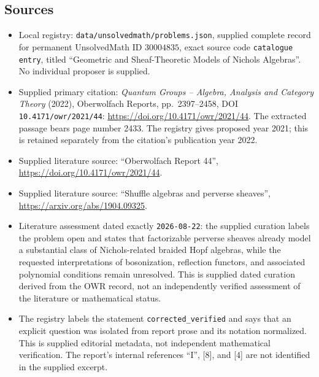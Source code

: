 \documentclass[11pt]{article}
\begin{document}
\subsection{Sources}
\begin{itemize}
\item Local registry: \texttt{data/unsolvedmath/problems.json}, supplied complete record for permanent UnsolvedMath ID \(30004835\), exact source code \texttt{catalogue entry}, titled ``Geometric and Sheaf-Theoretic Models of Nichols Algebras''. No individual proposer is supplied.
\item Supplied primary citation: \emph{Quantum Groups -- Algebra, Analysis and Category Theory} (2022), Oberwolfach Reports, pp.~2397--2458, DOI \texttt{10.4171/owr/2021/44}: \url{https://doi.org/10.4171/owr/2021/44}. The extracted passage bears page number 2433. The registry gives proposed year 2021; this is retained separately from the citation's publication year 2022.
\item Supplied literature source: ``Oberwolfach Report 44'', \url{https://doi.org/10.4171/owr/2021/44}.
\item Supplied literature source: ``Shuffle algebras and perverse sheaves'', \url{https://arxiv.org/abs/1904.09325}.
\item Literature assessment dated exactly \texttt{2026-08-22}: the supplied curation labels the problem open and states that factorizable perverse sheaves already model a substantial class of Nichols-related braided Hopf algebras, while the requested interpretations of bosonization, reflection functors, and associated polynomial conditions remain unresolved. This is supplied dated curation derived from the OWR record, not an independently verified assessment of the literature or mathematical status.
\item The registry labels the statement \texttt{corrected\_verified} and says that an explicit question was isolated from report prose and its notation normalized. This is supplied editorial metadata, not independent mathematical verification. The report's internal references ``I'', [8], and [4] are not identified in the supplied excerpt.
\end{itemize}
\end{document}
